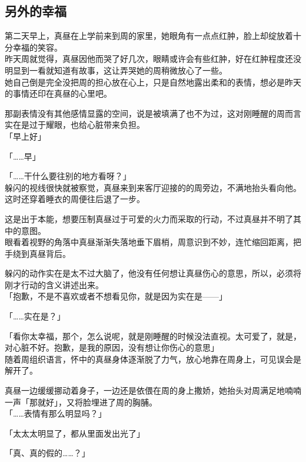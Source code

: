 \subsection{另外的幸福}

第二天早上，真昼在上学前来到周的家里，她眼角有一点点红肿，脸上却绽放着十分幸福的笑容。\\

昨天周就觉得，真昼因他而哭了好几次，眼睛或许会有些红肿，好在红肿程度还没明显到一看就知道有故事，这让弄哭她的周稍微放心了一些。\\

她自己倒是完全没把周的担心放在心上，只是自然地露出柔和的表情，想必是昨天的事情还印在真昼的心里吧。

那副表情没有其他感情显露的空间，说是被填满了也不为过，这对刚睡醒的周而言实在是过于耀眼，也给心脏带来负担。\\

「早上好」

「……早」

「……干什么要往别的地方看呀？」\\

躲闪的视线很快就被察觉，真昼来到来客厅迎接的的周旁边，不满地抬头看向他。这时还穿着睡衣的周便往后退了一步。

这是出于本能，想要压制真昼过于可爱的火力而采取的行动，不过真昼并不明了其中的意图。\\

眼看着视野的角落中真昼渐渐失落地垂下眉梢，周意识到不妙，连忙缩回距离，把手绕到真昼背后。

躲闪的动作实在是太不过大脑了，他没有任何想让真昼伤心的意思，所以，必须将刚才行动的含义讲述出来。\\

「抱歉，不是不喜欢或者不想看见你，就是因为实在是——」

「……实在是？」

「看你太幸福，那个，怎么说呢，就是刚睡醒的时候没法直视。太可爱了，就是，对心脏不好。抱歉，是我的原因，没有想让你伤心的意思」\\

随着周组织语言，怀中的真昼身体逐渐脱了力气，放心地靠在周身上，可见误会是解开了。

真昼一边缓缓挪动着身子，一边还是依偎在周的身上撒娇，她抬头对周满足地喃喃一声「那就好」，又将脸埋进了周的胸脯。\\

「……表情有那么明显吗？」

「太太太明显了，都从里面发出光了」

「真、真的假的……？」

